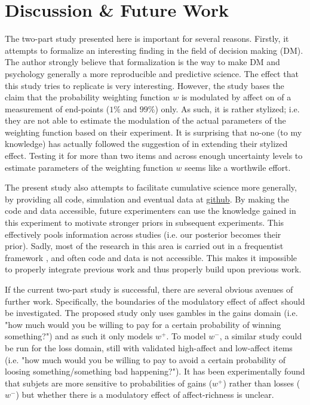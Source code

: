 \documentclass[12pt]{article}
\begin{document}
\section{Discussion \& Future Work}

The two-part study presented here is important
for several reasons. Firstly, it attempts to
formalize an interesting finding in the
field of decision making (DM). The author
strongly believe that formalization is the way to
make DM and psychology generally a more
reproducible and predictive science.
The effect that this study tries to replicate
\autocite{rottenstreich2001money} is
very interesting. However, the study
bases the claim that the
probability weighting function $w$ is
modulated by affect on of a measurement of end-points
($1\%$ and $99\%$) only.
As such, it is rather stylized; i.e. they
are not able to estimate the modulation of
the actual parameters of the weighting function
based on their experiment.
It is surprising that no-one (to my knowledge)
has actually followed the suggestion
of \autocite{rottenstreich2001money} in extending
their stylized effect. Testing it for more than
two items and across enough uncertainty
levels to estimate parameters of the weighting
function $w$ seems like a worthwile effort.

\vspace{3mm}
The present study also attempts to facilitate
cumulative science more generally, by providing
all code, simulation and eventual data at
\href{https://github.com/victor-m-p/BayesianDecisionWeights}
{github}.
By making the code and data accessible, future
experimenters can use the knowledge gained in
this experiment to motivate stronger priors in
subsequent experiments. This effectively
pools information across studies
(i.e. our posterior becomes their prior). Sadly,
most of the research in this area is carried
out in a frequentist framework
\autocite{gonzalez1999shape, rottenstreich2001money,
hsee2004music}, and often
code and data is not accessible. This makes it
impossible to properly integrate previous work
and thus properly build upon previous work.

\vspace{3mm}
If the current two-part study is successful,
there are several obvious avenues of further
work. Specifically, the boundaries of the modulatory
effect of affect should be investigated. The
proposed study
only uses gambles in the gains domain (i.e. "how
much would you be willing to pay for a
certain probability of winning something?")
and as such it only models $w^{+}$. To model
$w^{-}$, a similar
study could be run for the loss domain, still with
validated high-affect and low-affect items (i.e. "how
much would you be willing to pay to avoid a
certain probability of loosing something/something
bad happening?"). It has been experimentally
found that subjets are more sensitive to
probabilities of gains ($w^{+}$) rather than
losses ($w^{-}$) \autocite{
abdellaoui2010separating} but whether there is a
modulatory effect of affect-richness is unclear.\\
\end{document}
